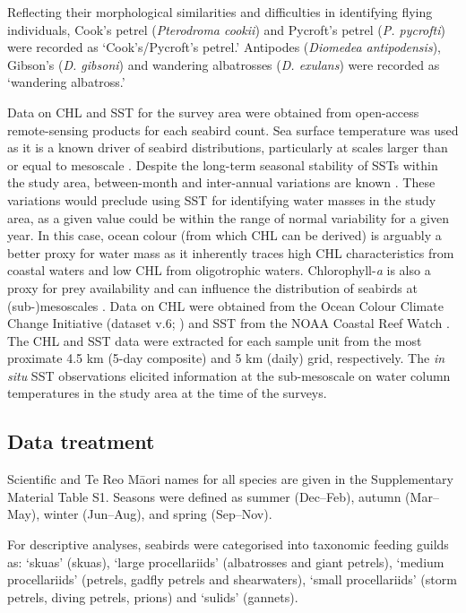 \documentclass[preprint, 3p, authoryear]{elsarticle} %
\begin{document}
Reflecting their morphological similarities and difficulties in identifying flying individuals, Cook's petrel (\emph{Pterodroma cookii}) and Pycroft's petrel (\emph{P. pycrofti}) were recorded as `Cook's/Pycroft's petrel.' Antipodes (\emph{Diomedea antipodensis}), Gibson's (\emph{D. gibsoni}) and wandering albatrosses (\emph{D. exulans}) were recorded as `wandering albatross.'

Data on CHL and SST for the survey area were obtained from open-access remote-sensing products for each seabird count. Sea surface temperature was used as it is a known driver of seabird distributions, particularly at scales larger than or equal to mesoscale \citep[e.g.,][]{evans2021, daudt2024}. Despite the long-term seasonal stability of SSTs within the study area, between-month and inter-annual variations are known \citep{wijffels2018}. These variations would preclude using SST for identifying water masses in the study area, as a given value could be within the range of normal variability for a given year. In this case, ocean colour (from which CHL can be derived) is arguably a better proxy for water mass as it inherently traces high CHL characteristics from coastal waters and low CHL from oligotrophic waters. Chlorophyll-\emph{a} is also a proxy for prey availability and can influence the distribution of seabirds at (sub-)mesoscales \citep{weimerskirch2007}. Data on CHL were obtained from the Ocean Colour Climate Change Initiative (dataset v.6; \citet{sathyendranath2019}) and SST from the NOAA Coastal Reef Watch \citep{skirving2020}. The CHL and SST data were extracted for each sample unit from the most proximate 4.5 km (5-day composite) and 5 km (daily) grid, respectively. The \emph{in situ} SST observations elicited information at the sub-mesoscale on water column temperatures in the study area at the time of the surveys.

\subsection{Data treatment}

Scientific and Te Reo M\={a}ori names for all species are given in the Supplementary Material Table S1. Seasons were defined as summer (Dec--Feb), autumn (Mar--May), winter (Jun--Aug), and spring (Sep--Nov).

For descriptive analyses, seabirds were categorised into taxonomic feeding guilds as: `skuas' (skuas), `large procellariids' (albatrosses and giant petrels), `medium procellariids' (petrels, gadfly petrels and shearwaters), `small procellariids' (storm petrels, diving petrels, prions) and `sulids' (gannets).
\end{document}
